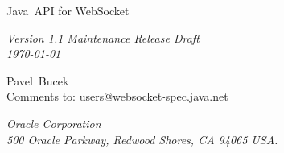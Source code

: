 \begin{titlepage}
\raggedleft

\vspace*{60pt}

{\Huge
\textsf{Java\texttrademark\ API for WebSocket
\vspace{10pt}}}

\vspace{20pt}

{
\Large\textit{Version 1.1 Maintenance Release Draft \\
\today}
}

\vspace{40pt}

{\large Pavel\ Bucek\\
\vspace{10pt}Comments to: users@websocket-spec.java.net
}

\vspace{80pt}

{\small\textit{Oracle Corporation\\
500 Oracle Parkway, Redwood Shores, CA 94065 USA.}
}
\end{titlepage} 
